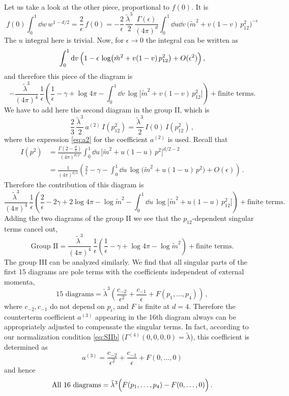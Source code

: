 Let us take a look at the other piece, proportional to $f(0)$. It is
\[
f(0)\int_0^1\dd w\,w^{1-d/2}=\frac2\epsilon\,f(0)=-\frac2\epsilon\,\frac{\tilde\lambda^3}2\,\frac{\Gamma(\epsilon)}{(4\pi)^d}\int_0^1\dd u\dd v\,\bigl(\tilde m^2+v(1-v)\,p_{12}^2\bigr)^{-\epsilon}
\]
The $u$ integral here is trivial. Now, for $\epsilon\to0$ the integral can be
written as
\[
\int_0^1\mathop{}\!\mathrm{d} v\,\Bigl(1-\epsilon\,\log\bigl(\tilde m^2+v(1-v)\,p_{12}^2\bigr)+O(\epsilon^2)\Bigr)\,,
\]
and therefore this piece of the diagram is
\[
-\frac{\tilde\lambda^3}{(4\pi)^4}\,\frac1\epsilon\left(\frac1\epsilon-\gamma+\log4\pi-\int_0^1\dd v\,\log\bigl[\tilde m^2+v(1-v)\,p_{12}^2\bigr]\right)+\text{finite terms.}
\]
We have to add here the second diagram in the group II, which is
\[
\frac23\,\frac{\tilde\lambda^3}2\,a^{(2)}\,I(p_{12}^2)=\frac{\tilde\lambda^3}2\,I(0)\,I(p_{12}^2)\,,
\]
where the expression \eqref{eq:a2} for the coefficient $a^{(2)}$ is used. Recall
that
\begin{align*}
I(p^2)&=\frac{\Gamma\left(2-\frac d2\right)}{(4\pi)^{d/2}}\int_0^1\dd u\,\bigl[\tilde m^2+u(1-u)\,p^2\bigr]^{d/2-2}\\
&=\frac1{(4\pi)^{d/2}}\left(\frac2\epsilon-\gamma-\int_0^1\dd u\,\log\bigl(\tilde m^2+u(1-u)\,p^2\bigr)+O(\epsilon)\right)\,.
\end{align*}
Therefore the contribution of this diagram is
\[
\frac{\tilde\lambda^3}{(4\pi)^4}\,\frac1\epsilon\left(\frac2\epsilon-2\gamma+2\log4\pi-\log\tilde m^2-\int_0^1\dd u\,\log\bigl[\tilde m^2+u(1-u)\,p_{12}^2\bigr]\right)+\text{finite terms.}
\]
Adding the two diagrams of the group II we see that the $p_{12}$-dependent
singular terms cancel out,
\[
\text{Group II}=\frac{\tilde\lambda^3}{(4\pi)^4}\,\frac1\epsilon\left(\frac1\epsilon-\gamma+\log4\pi-\log\tilde m^2\right)+\text{finite terms.}
\]
The group III can be analyzed similarly. We find that all singular parts of the
first 15 diagrams are pole terms with the coefficients independent of external
momenta,
\begin{equation}\label{eq:15diagrams}
\text{15 diagrams}=\tilde\lambda^3\left(\frac{c_{-2}}{\epsilon^2}+\frac{c_{-1}}\epsilon+F(p_1,\dots,p_4)\right)\,,
\end{equation}
where $c_{-2},c_{-1}$ do not depend on $p_i$, and $F$ is finite at $d=4$.
Therefore the counterterm coefficient $a^{(3)}$ appearing in the 16th diagram
always can be appropriately adjusted to compensate the singular terms. In fact,
according to our normalization condition \eqref{eq:SIIb}
($\Gamma^{(4)}(0,0,0,0)=\tilde\lambda$), this coefficient is determined as
\[
a^{(3)}=\frac{c_{-2}}{\epsilon^2}+\frac{c_{-1}}\epsilon+F(0,\dots,0)
\]
and hence
\[
\text{All 16 diagrams}=\tilde\lambda^3\Bigl(F(p_1,\dots,p_4)-F(0,\dots,0)\Bigr)\,.
\]

